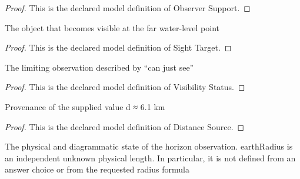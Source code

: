 \begin{proof}
  This is the declared model definition of Observer Support.
\end{proof}
\begin{definition}
  \label{def:physics:phyx-mini-0726:phyxminiproblems-problemphyxmini0726-sighttarget}
  The object that becomes visible at the far water-level point
\end{definition}
\begin{proof}
  This is the declared model definition of Sight Target.
\end{proof}
\begin{definition}
  \label{def:physics:phyx-mini-0726:phyxminiproblems-problemphyxmini0726-visibilitystatus}
  The limiting observation described by “can just see”
\end{definition}
\begin{proof}
  This is the declared model definition of Visibility Status.
\end{proof}
\begin{definition}
  \label{def:physics:phyx-mini-0726:phyxminiproblems-problemphyxmini0726-distancesource}
  Provenance of the supplied value d ≈ 6.1 km
\end{definition}
\begin{proof}
  This is the declared model definition of Distance Source.
\end{proof}
\begin{definition}
  \label{def:physics:phyx-mini-0726:phyxminiproblems-problemphyxmini0726-earthhorizonsetup}
  The physical and diagrammatic state of the horizon observation. earthRadius is an independent unknown physical length. In particular, it is not defined from an answer choice or from the requested radius formula
\end{definition}
